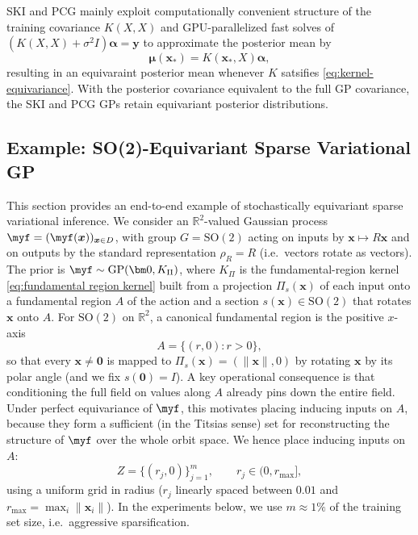 \documentclass[11pt,a4paper]{article}
\newcommand{\bff}{\boldsymbol{f}}
\newcommand{\bx}{\boldsymbol{x}}
\newcommand{\by}{\boldsymbol{y}}
\begin{document}
SKI \cite{Wilson2015KernelIF} and PCG \cite{pcg} mainly exploit computationally convenient structure of the training covariance $K(X,X)$ and GPU-parallelized fast solves of $(K(X,X)+\sigma^2I)\boldsymbol{\alpha}=\by$ to approximate the posterior mean by
\begin{equation*}\boldsymbol{\mu}(\bx_\ast)=K(\bx_\ast,X)\boldsymbol{\alpha},\end{equation*}
resulting in an equivaraint posterior mean whenever $K$ satsifies \eqref{eq:kernel-equivariance}.
With the posterior covariance equivalent to the full GP covariance, the SKI and PCG GPs retain equivariant posterior distributions.

\subsection{Example: SO(2)-Equivariant Sparse Variational GP}
\label{subsec:so2-svgp-example}
This section provides an end-to-end example of stochastically equivariant sparse variational inference. We consider an $\mathbb{R}^2$-valued Gaussian process $\myf=(\myf(\bx))_{\bx\in D}$, with group $G=\mathrm{SO}(2)$
acting on inputs by $\bx\mapsto R\bx$ and on outputs by the standard representation $\rho_R=R$ (i.e.\ vectors rotate as vectors).
The prior is $\myf\sim\mathrm{GP}(\bm 0,K_\Pi)$, where $K_\Pi$ is the  fundamental-region kernel \eqref{eq:fundamental region kernel} built from a projection $\Pi_s(\bx)$ of each input onto a fundamental region $A$ of the action and a section $s(\bx)\in \mathrm{SO}(2)$ that rotates $\bx$ onto $A.$ For $\mathrm{SO}(2)$ on $\mathbb{R}^2$, a canonical fundamental region is the positive $x$-axis
\begin{displaymath}A=\{(r,0): r>0\},\end{displaymath}
so that every $\bx\neq \bm 0$ is mapped to $\Pi_s(\bx)=(\|\bx\|,0)$ by rotating $\bx$ by its polar angle (and we fix $s(\bm 0)=I$).
A key operational consequence is that conditioning the full field on values along $A$ already pins down the entire field. %
Under perfect equivariance of $\myf$, this motivates placing inducing inputs on $A$, because they form a sufficient (in the Titsias sense) set for reconstructing the structure of $\myf$ over the whole orbit space. We hence place inducing inputs on $A$:
\begin{displaymath}Z=\{(r_j,0)\}_{j=1}^m,\qquad r_j\in(0,r_{\max}],\end{displaymath}
using a uniform grid in radius ($r_j$ linearly spaced between $0.01$ and $r_{\max}=\max_i\|\bx_i\|$).
In the experiments below, we use $m \approx 1\%$ of the training set size, i.e.\ aggressive sparsification.
\end{document}
